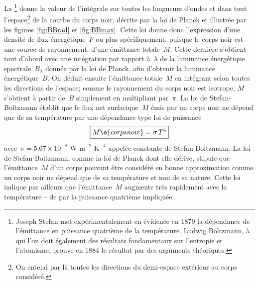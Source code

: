 \sk
La \footnote{Joseph Stefan met expérimentalement en évidence en 1879 la dépendance de l'émittance en puissance quatrième de la température. Ludwig Boltzmann, à qui l'on doit également des résultats fondamentaux sur l'entropie et l'atomisme, prouve en 1884 le résultat par des arguments théoriques.} donne la valeur de l'intégrale sur toutes les longueurs d'ondes et dans tout l'espace\footnote{On entend par là toutes les directions du demi-espace extérieur au corps considéré.} de la courbe du corps noir, décrite par la loi de Planck et illustrée par les figures \ref{fig:BBrad} et \ref{fig:BBmax}. Cette loi donne donc l'expression d'une densité de flux énergétique~$F$ ou plus spécifiquement, puisque le corps noir est une source de rayonnement, d'une émittance totale~$M$. Cette dernière s'obtient tout d'abord avec une intégration par rapport à~$\lambda$ de la luminance énergétique spectrale~$B_\lambda$ donnée par la loi de Planck, afin d'obtenir la luminance énergétique~$B$. On déduit ensuite l'émittance totale~$M$ en intégrant selon toutes les directions de l'espace; comme le rayonnement du corps noir est isotrope, $M$ s'obtient à partir de~$B$ simplement en multipliant par~$\pi$. La loi de Stefan-Boltzmann établit que le flux net surfacique~$M$ émis par un corps noir ne dépend que de sa température par une dépendance type loi de puissance $$ \boxed{ M\e{corps noir} = \sigma \, T^4 } $$ avec~$\sigma=5.67 \times 10^{-8} \textrm{~W~m}^{-2}\textrm{~K}^{-4}$ appelée constante de Stefan-Boltzmann. La loi de Stefan-Boltzmann, comme la loi de Planck dont elle dérive, stipule que l'émittance~$M$ d'un corps pouvant être considéré en bonne approximation comme un corps noir ne dépend que de sa température et non de sa nature. Cette loi indique par ailleurs que l'émittance~$M$ augmente très rapidement avec la température -- de par la puissance quatrième impliquée.
